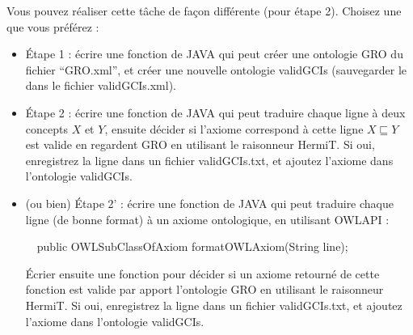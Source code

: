 \documentclass{article}
\begin{document}
Vous pouvez réaliser cette tâche de façon différente (pour étape 2). Choisez une que vous préférez :
\begin{itemize}
\item Étape 1 : écrire une fonction de JAVA qui peut créer une ontologie GRO du fichier ``GRO.xml'', et créer une nouvelle ontologie validGCIs (sauvegarder le dans le fichier validGCIs.xml).
\item Étape 2 : écrire une fonction de JAVA qui peut traduire chaque ligne  à deux concepts $X$ et $Y$, ensuite décider si l'axiome correspond à cette ligne $X\sqsubseteq Y$ est valide en regardent GRO en utilisant le raisonneur HermiT. Si oui, enregistrez la ligne dans un fichier validGCIs.txt, et ajoutez l'axiome  dans l'ontologie validGCIs.
\item (ou bien) Étape 2' : écrire une fonction de JAVA qui peut traduire chaque ligne (de bonne format) à un axiome ontologique, en utilisant OWLAPI :

\qquad \ \ public OWLSubClassOfAxiom formatOWLAxiom(String line);

Écrier ensuite une fonction pour décider si un axiome retourné de cette fonction est valide par apport l'ontologie GRO en utilisant le raisonneur HermiT. Si oui, enregistrez la ligne dans un fichier validGCIs.txt, et ajoutez l'axiome  dans l'ontologie validGCIs. 
\end{itemize}
\end{document}
